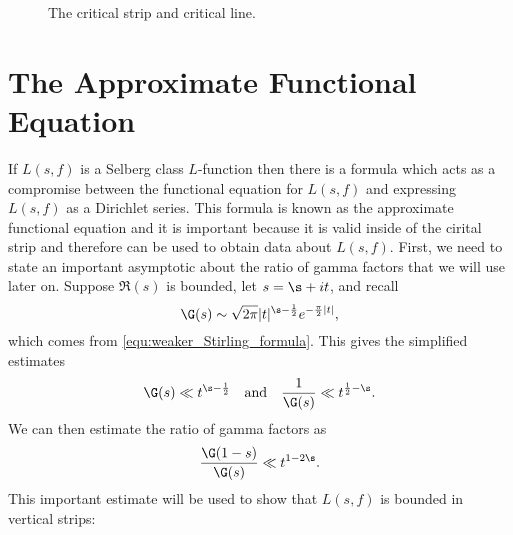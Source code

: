       \begin{figure}[ht]
        \centering
        \caption{The critical strip and critical line.}
        \label{fig:critical_strip}
      \end{figure}
    \section{The Approximate Functional Equation}
      If $L(s,f)$ is a Selberg class $L$-function then there is a formula which acts as a compromise between the functional equation for $L(s,f)$ and expressing $L(s,f)$ as a Dirichlet series. This formula is known as the approximate functional equation and it is important because it is valid inside of the cirital strip and therefore can be used to obtain data about $L(s,f)$. First, we need to state an important asymptotic about the ratio of gamma factors that we will use later on. Suppose $\Re(s)$ is bounded, let $s = \s+it$, and recall 
      \[
          \G(s) \sim \sqrt{2\pi}|t|^{\s-\frac{1}{2}}e^{-\frac{\pi}{2}|t|},
      \]
      which comes from \cref{equ:weaker_Stirling_formula}. This gives the simplified estimates
      \[
        \G(s) \ll t^{\s-\frac{1}{2}} \quad \text{and} \quad \frac{1}{\G(s)} \ll t^{\frac{1}{2}-\s}.
      \]
      We can then estimate the ratio of gamma factors as 
      \begin{equation}\label{equ:ratio_of_gamma_estimate}
        \frac{\G(1-s)}{\G(s)} \ll t^{1-2\s}.
      \end{equation}
      This important estimate will be used to show that $L(s,f)$ is bounded in vertical strips:


